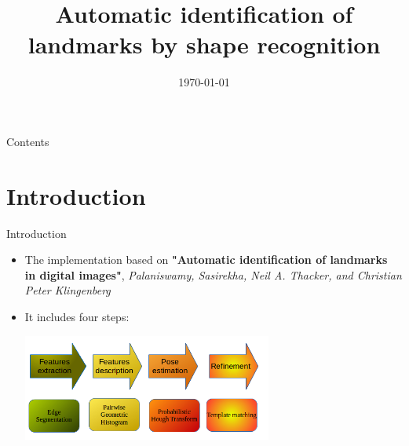 \documentclass{beamer}
\title{Automatic identification of landmarks by shape recognition}
\date{\today}
\begin{document}
\frame{\titlepage}
\begin{frame}{Contents}
	\tableofcontents
\end{frame}
\section{Introduction}
\begin{frame}{Introduction}
	\begin{itemize}
	\item The implementation based on \textbf{"Automatic identification of landmarks in digital images"}, \textit{Palaniswamy, Sasirekha, Neil A. Thacker, and Christian Peter Klingenberg} \\
	\item It includes four steps:
		\begin{center}
			\includegraphics[height=3.5cm]{images/flow_step.png}	
		\end{center}
	\end{itemize}
\end{frame}
\end{document}
